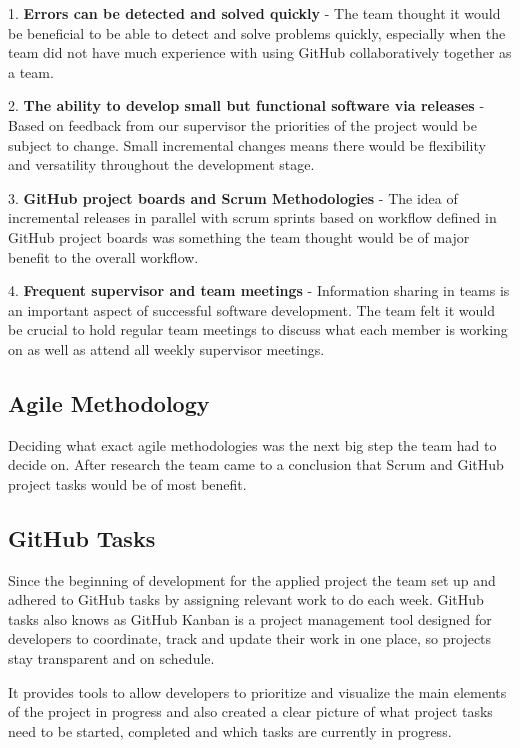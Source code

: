 1. \textbf{Errors can be detected and solved quickly} - The team thought it would be beneficial to be able to detect and solve problems quickly, especially when the team did not have much experience with using GitHub collaboratively together as a team.

2. \textbf{The ability to develop small but functional software via releases} - Based on feedback from our supervisor the priorities of the project would be subject to change. Small incremental changes means there would be flexibility and versatility throughout the development stage.

3. \textbf{GitHub project boards and Scrum Methodologies} - The idea of incremental releases in parallel with scrum sprints based on workflow defined in GitHub project boards was something the team thought would be of major benefit to the overall workflow.

4. \textbf{Frequent supervisor and team meetings} - Information sharing in teams is an important aspect of successful software development. The team felt it would be crucial to hold regular team meetings to discuss what each member is working on as well as attend all weekly supervisor meetings.

\subsection{Agile Methodology}
Deciding what exact agile methodologies was the next big step the team had to decide on. After research the team came to a conclusion that Scrum and GitHub project tasks would be of most benefit.


\subsection{GitHub Tasks}
Since the beginning of development for the applied project the team set up and adhered to GitHub tasks by assigning relevant work to do each week. GitHub tasks also knows as GitHub Kanban is a project management tool designed for developers to coordinate, track and update their work in one place, so projects stay transparent and on schedule.

\vspace{5mm} %


It provides tools to allow developers to prioritize and visualize the main elements of the project in progress and also created a clear picture of what project tasks need to be started, completed and which tasks are currently in progress. 

